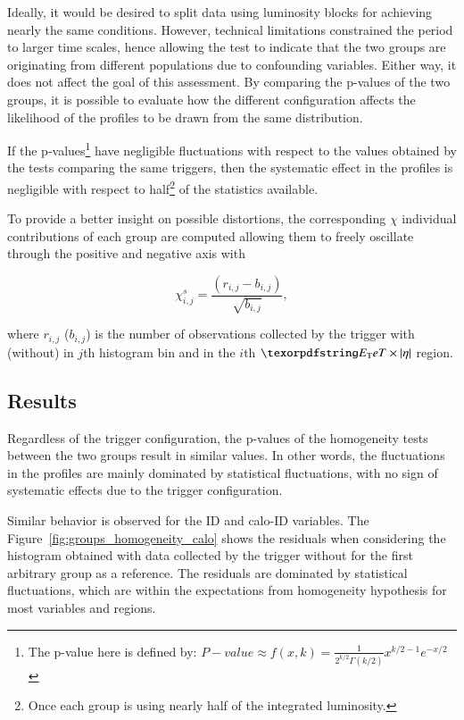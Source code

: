 Ideally, it would be desired to split data using luminosity
blocks for achieving nearly the same conditions. However, technical limitations
constrained the period to larger time scales, hence allowing the test to
indicate that the two groups are originating from different populations due to
confounding variables. Either way, it does not affect the goal of this assessment. 
By comparing the p-values of the two groups, it is possible to evaluate how the different configuration affects the likelihood of the profiles to be drawn from the same distribution. 


If the p-values\footnote{The p-value here is defined by: $P-value \approx f(x, k) = \frac{1}{2^{k/2}\Gamma(k/2)}x^{k/2 -1}e^{-x/2}$} have negligible fluctuations with respect to the values obtained by the tests comparing the same triggers, then the systematic effect in the profiles is negligible with respect to half\footnote{Once each group is using nearly half of the integrated luminosity.} of the statistics available.



To provide a better insight on possible distortions, the corresponding $\chi$
individual contributions of each group are computed allowing them to freely
oscillate through the positive and negative axis with

\begin{equation}
  \chi_{i,j}^{s} = \frac{(r_{i,j} - b_{i,j})}{\sqrt{b_{i,j}}},
  \label{eq:signed_chi}
\end{equation}

\noindent where $r_{i,j}$ ($b_{i,j}$) is the number of observations collected by
the trigger with (without) \rnn{} in $j$th histogram bin and in the $i$th
$\et{}\times\abseta{}$ region.


\subsection{Results}\label{top:agreement_homogeneity_results}




Regardless of the trigger configuration, the p-values of the homogeneity tests between the two groups result in similar values. In other words, the fluctuations in the profiles are mainly dominated by statistical fluctuations, with no sign of systematic effects due to the trigger configuration. 

Similar behavior is observed for the ID and calo-ID variables. The Figure~\ref{fig:groups_homogeneity_calo} shows the residuals when considering the histogram obtained with data collected by the trigger without \rnn{} for the first arbitrary group as a reference. The residuals are dominated by statistical fluctuations, which are within the expectations from homogeneity hypothesis for most variables and regions.


